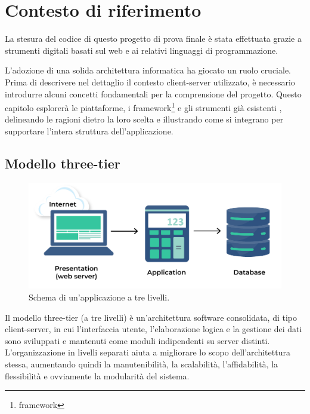 \setlength{\headheight}{14.49998pt}
\addtolength{\topmargin}{-2.49998pt}
\chapter{Contesto di riferimento}\label{ch:Contesto}
La stesura del codice di questo progetto di prova finale è stata effettuata grazie a strumenti digitali basati sul web e ai relativi linguaggi di programmazione. 

L'adozione di una solida architettura informatica ha giocato un ruolo cruciale. 
Prima di descrivere nel dettaglio il contesto client-server utilizzato, è necessario introdurre alcuni concetti fondamentali per la comprensione del progetto.
Questo capitolo esplorerà le piattaforme, i \gls{framework}\footnote{\glsdesc{framework}} e gli strumenti già esistenti \cite{ngrx} \cite{reactivex}, delineando le ragioni dietro la loro scelta e illustrando come si integrano per supportare l'intera struttura dell'applicazione.

\section{Modello three-tier}\label{sec:three-tier}
\begin{figure}[H]
\centering
\includegraphics[width=1\textwidth]{Images/3-Tier-architecture.png}
\caption{\label{fig:three-tier}Schema di un'applicazione a tre livelli.}
\end{figure}

Il modello three-tier (a tre livelli) è un'architettura software consolidata, di tipo client-server, in cui l'interfaccia utente, l'elaborazione logica e la gestione dei dati sono sviluppati e mantenuti come moduli indipendenti su server distinti. L'organizzazione in livelli separati aiuta a migliorare lo scopo dell'architettura stessa, aumentando quindi la manutenibilità, la scalabilità, l'affidabilità, la flessibilità e ovviamente la modularità del sistema.

